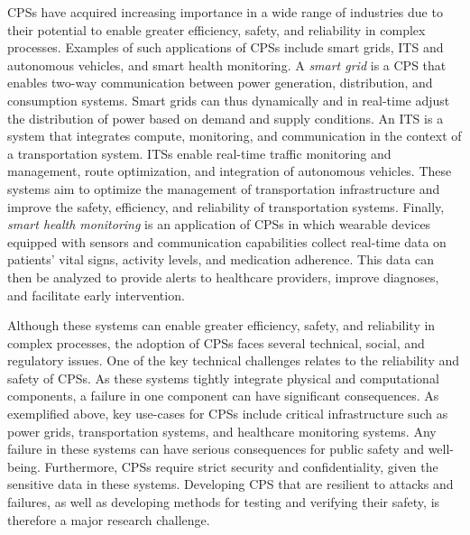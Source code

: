 \glspl{CPS} have acquired increasing importance in a wide range of industries due to their potential to enable greater efficiency, safety, and reliability in complex processes.
Examples of such applications of \glspl{CPS} include smart grids, \acs{ITS} and autonomous vehicles, and smart health monitoring.
A \emph{smart grid} is a \gls{CPS} that enables two-way communication between power generation, distribution, and consumption systems.
Smart grids can thus dynamically and in real-time adjust the distribution of power based on demand and supply conditions.
 An \gls{ITS} is a system that integrates compute, monitoring, and communication in the context of a transportation system.
\glspl{ITS} enable real-time traffic monitoring and management, route optimization, and integration of autonomous vehicles.
These systems aim to optimize the management of transportation infrastructure and improve the safety, efficiency, and reliability of transportation systems.
Finally, \emph{smart health monitoring} is an application of \glspl{CPS} in which wearable devices equipped with sensors and communication capabilities collect real-time data on patients' vital signs, activity levels, and medication adherence.
This data can then be analyzed to provide alerts to healthcare providers, improve diagnoses, and facilitate early intervention.

Although these systems can enable greater efficiency, safety, and reliability in complex processes, the adoption of \glspl{CPS} faces several technical, social, and regulatory issues.
One of the key technical challenges relates to the reliability and safety of \glspl{CPS}.
As these systems tightly integrate physical and computational components, a failure in one component can have significant consequences.
As exemplified above, key use-cases for \glspl{CPS} include critical infrastructure such as power grids, transportation systems, and healthcare monitoring systems.
Any failure in these systems can have serious consequences for public safety and well-being.
Furthermore, \glspl{CPS} require strict security and confidentiality, given the sensitive data in these systems.
Developing CPS that are resilient to attacks and failures, as well as developing methods for testing and verifying their safety, is therefore a major research challenge.

\paragraph{}\label{background:ncs}

